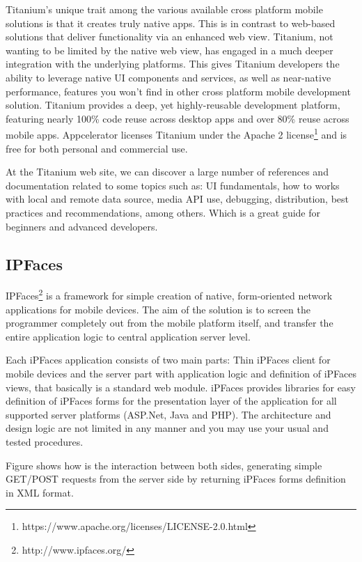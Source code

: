 \documentclass[a4paper,12pt]{book}
\begin{document}
Titanium's unique trait among the various available cross platform mobile solutions is that it creates truly native apps. This is in contrast to web-based solutions that deliver functionality via an enhanced web view. Titanium, not wanting to be limited by the native web view, has engaged in a much deeper integration with the underlying platforms. This gives Titanium developers the ability to leverage native UI components and services, as well as near-native performance, features you won't find in other cross platform mobile development solution. Titanium provides a deep, yet highly-reusable development platform, featuring nearly 100\% code reuse across desktop apps and over 80\% reuse across mobile apps. Appcelerator licenses Titanium under the Apache 2 license\footnote{https://www.apache.org/licenses/LICENSE-2.0.html}  and is free for both personal and commercial use.

At the Titanium web site, we can discover a large number of references and documentation related to some topics such as: UI fundamentals, how to works with local and remote data source, media API use, debugging, distribution, best practices and recommendations, among others. Which is a great guide for beginners and advanced developers.

\subsection{IPFaces}
\label{IPFaces} 

IPFaces\footnote{http://www.ipfaces.org/} is a framework for simple creation of native, form-oriented network applications for mobile devices. The aim of the solution is to screen the programmer completely out from the mobile platform itself, and transfer the entire application logic to central application server level.

Each iPFaces application consists of two main parts: Thin iPFaces client for mobile devices and the server part with application logic and definition of iPFaces views, that basically  is a standard web module. iPFaces provides libraries for easy definition of iPFaces forms for the presentation layer of the application for all supported server platforms (ASP.Net, Java and PHP). The architecture and design logic are not limited in any manner and you may use your usual and tested procedures. 

Figure shows how is the interaction between both sides, generating simple GET/POST requests from the server side by returning iPFaces forms definition in XML format.
\end{document}
